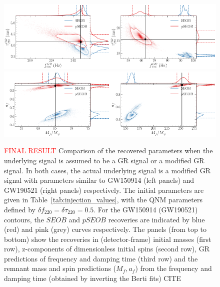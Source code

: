 \documentclass[twocolumn,prd,aps,superscriptaddress,preprintnumbers,tightenlines,showpacs,nofootinbib,eqsecnum,amsfonts,amsmath]{revtex4-1}
\newcommand{\df}[1]{\delta f_{\text{#1}}}
\newcommand{\dtau}[1]{\delta \tau_{\text{#1}}}
\begin{document}
\begin{figure}
	\includegraphics[width=0.5\textwidth]{figures/GW150914_simulated_signal_0p5_gr_ngr_fgrtaugr.png}\includegraphics[width=0.5\textwidth]{figures/GW190521_simulated_signal_0p5_gr_ngr_fgrtaugr.png}
	\includegraphics[width=0.5\textwidth]{figures/GW150914_simulated_signal_0p5_gr_ngr_Mfaf.png}\includegraphics[width=0.5\textwidth]{figures/GW190521_simulated_signal_0p5_gr_ngr_Mfaf.png}
	\caption{\textcolor{red}{FINAL RESULT} Comparison of the recovered parameters when the underlying signal is assumed to be a GR signal or a modified GR signal. In both cases, the actual underlying signal is a modified GR signal with parameters similar to GW150914 (left panels) and GW190521 (right panels) respectively. The initial parameters are given in Table~\ref{tab:injection_values}, with the QNM parameters defined by $\df{220} = \dtau{220} = 0.5$. For the GW150914 (GW190521) contours, the $SEOB$ and $pSEOB$ recoveries are indicated by blue (red) and pink (grey) curves respectively. The panels (from top to bottom) show the recoveries in (detector-frame) initial masses (first row), z-components of dimensionless initial spins (second row), GR predictions of frequency and damping time (third row) and the remnant mass and spin predictions ($M_f, a_f$) from the frequency and damping time (obtained by inverting the Berti fits) CITE}
	\label{fig:gr_ngr_comparison}
\end{figure}
\end{document}
